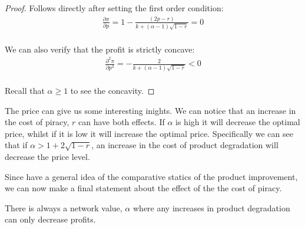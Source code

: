 \begin{proof}
Follows directly after setting the first order condition:
\begin{align*} \label{FOC}
\frac{\partial \pi }{\partial p} = 1-\frac{ (2p-r)}{
k+ (\alpha-1)\sqrt{ 1 -r }} =0\\
\end{align*}

We can also verify that the profit is strictly concave: 
\begin{align*}
\frac{\partial^2 \pi }{\partial p^2}
= -\frac{ 2}{
k+ (\alpha-1)\sqrt{ 1 -r }} < 0 \\
\end{align*}

Recall that $\alpha \geq 1$ to see the concavity. 
\end{proof}

The price can give us some interesting inights. We can notice that an increase in the cost of piracy, $r$ can have both effects. If $\alpha$ is high it will decrease the optimal price, whilst if it is low it will increase the optimal price.  Specifically we can see that if $\alpha> 1+2 \sqrt{1-r}$, an increase in the cost of product degradation will decrease the price level. 






Since have a general idea of the comparative statics of the product improvement, we can now make a final statement about the effect of the the cost of piracy. 

\begin{proposition}
There is always a network value, $\alpha$ where any increases in product degradation can only decrease profits.
\end{proposition}

